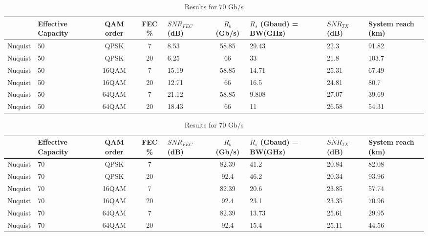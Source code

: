 \documentclass{article}
\begin{document}
\begin{table}[htb!]
    \centering
    \begin{tabular}{|c|p{1.5cm}|c|c|p{1.5cm}|c|p{1.5cm}|p{1.5cm}|p{1cm}|}
    \hline
         & Effective Capacity & QAM order & FEC \%  &  $SNR_{FEC}$ (dB) & $R_b$ (Gb/s) & $R_s$ (Gbaud) = BW(GHz) & $SNR_{TX}$ (dB) & System reach (km) \\ \hline
         Nuquist & 50 & QPSK & 7 & 8.53 & 58.85 & 29.43 & 22.3 & 91.82 \\ \hline
         Nuquist & 50 & QPSK & 20 & 6.25 & 66 & 33 & 21.8 & 103.7 \\ \hline
         Nuquist & 50 & 16QAM & 7 & 15.19 & 58.85 & 14.71 & 25.31 & 67.49 \\ \hline
         Nuquist & 50 & 16QAM & 20 & 12.71 & 66 & 16.5 & 24.81 & 80.7 \\ \hline
         Nuquist & 50 & 64QAM & 7 & 21.12 & 58.85 & 9.808 & 27.07 & 39.69 \\ \hline
         Nuquist & 50 & 64QAM & 20 & 18.43 & 66 & 11 & 26.58 & 54.31 \\ \hline

    \end{tabular}
    \caption{Results for 50 Gb/s}
    
    \begin{tabular}{|c|p{1.5cm}|c|c|p{1.5cm}|c|p{1.5cm}|p{1.5cm}|p{1cm}|}
    \hline
         & Effective Capacity & QAM order & FEC \%  &  $SNR_{FEC}$ (dB) & $R_b$ (Gb/s) & $R_s$ (Gbaud) = BW(GHz) & $SNR_{TX}$ (dB) & System reach (km) \\ \hline
         Nuquist & 70 & QPSK & 7 &  & 82.39 & 41.2 & 20.84 & 82.08 \\ \hline
         Nuquist & 70 & QPSK & 20 & & 92.4 & 46.2 & 20.34 & 93.96 \\ \hline
         Nuquist & 70 & 16QAM & 7 & & 82.39 & 20.6 & 23.85 & 57.74 \\ \hline
         Nuquist & 70 & 16QAM & 20 & & 92.4 & 23.1 & 23.35 & 70.96 \\ \hline
         Nuquist & 70 & 64QAM & 7 & & 82.39 & 13.73 & 25.61 & 29.95 \\ \hline
         Nuquist & 70 & 64QAM & 20 & & 92.4 & 15.4 & 25.11 & 44.56 \\ \hline

    \end{tabular}
    \caption{Results for 70 Gb/s}
    

\end{table}
\end{document}
